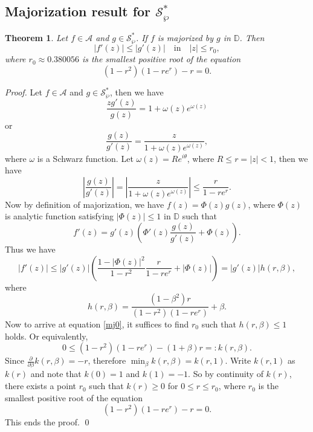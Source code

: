 \documentclass[12pt, reqno]{amsart}
\numberwithin{equation}{section}
\theoremstyle{plain}
\newtheorem{theorem}{Theorem}[section]
\theoremstyle{definition}
\theoremstyle{remark}
\begin{document}
\subsection{Majorization result for $\mathcal{S}^*_{\wp}$}
\begin{theorem}
	Let $f\in \mathcal{A}$ and $g\in \mathcal{S}^*_{\wp}$. If $f$ is majorized by $g$ in $\mathbb{D}$. Then
	\begin{equation}\label{mj0}
	|f'(z)|\leq|g'(z)| \quad \text{in}\quad |z|\leq r_0,
	\end{equation}
	where $r_0\approx 0.380056$ is the smallest positive root of the  equation $$(1-r^2)(1-re^r)-r=0.$$
\end{theorem}
\begin{proof}
	Let $f\in\mathcal{A}$ and $g\in\mathcal{S}^*_{\wp}$, then we have
	$$\frac{zg'(z)}{g(z)} = 1+\omega(z)e^{\omega(z)}$$
	or
	\begin{equation}\label{mj1}
	\frac{g(z)}{g'(z)}=\frac{z}{ 1+\omega(z)e^{\omega(z)} },
	\end{equation}
	where $\omega$ is a Schwarz function.	Let $\omega(z)=R e^{i\theta}$, where $R\leq r=|z|<1$, then we have
	\begin{equation}
	\left|\frac{g(z)}{g'(z)}\right| = \left|\frac{z}{ 1+\omega(z)e^{\omega(z)}} \right| \leq \frac{r}{1-re^r}.
	\end{equation}
	Now by definition of majorization, we have $f(z)=\Phi(z) g(z)$, where $\Phi(z)$ is analytic function satisfying $|\Phi(z)|\leq 1$ in $\mathbb{D}$ such that
	$$f'(z)=g'(z)\left(\Phi'(z)\frac{g(z)}{g'(z)}+ \Phi(z) \right).$$
	Thus we have
	\begin{equation}\label{mj2}
	|f'(z)|\leq |g'(z)| \left(\frac{1-|\Phi(z)|^2}{1-r^2} \frac{r}{1-re^r}+ |\Phi(z)| \right)=|g'(z)| h(r,\beta),
	\end{equation}
	where $$h(r,\beta)=\frac{(1-\beta^2)r}{(1-r^2)(1-re^r)}+\beta.$$
	Now to arrive at equation \eqref{mj0}, it suffices to find $r_0$ such that $h(r,\beta)\leq 1$ holds.  Or equivalently,
	$$0\leq (1-r^2)(1-re^r)-(1+\beta)r=: k(r,\beta).$$
	Since $\frac{\partial}{\partial\beta}k(r,\beta)=-r$, therefore $\min_\beta k(r,\beta)=k(r,1)$. Write $k(r,1)$ as $k(r)$ and note that $k(0)=1$ and $k(1)=-1$. So by continuity of $k(r)$, there exists a point $r_0$ such that $k(r)\geq0$ for $0\leq r\leq r_0$, where $r_0$ is the smallest positive root of the equation
	$$(1-r^2)(1-re^r)-r=0.$$ 
	This ends the proof. \qed
\end{proof}
\end{document}
